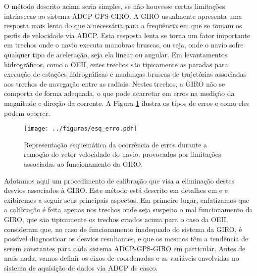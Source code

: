 O método descrito acima seria simples, se não houvesse certas limitações in\-trín\-se\-cas ao sistema ADCP-GPS-GIRO. 
A GIRO usualmente apresenta uma resposta mais lenta do que a necessária para a freq\"uência em que se tomam os 
perfis de velocidade via ADCP. Esta resposta lenta se torna um fator importante em trechos onde o navio 
executa manobras bruscas, ou seja, onde o navio sofre qualquer tipo de aceleração, seja ela linear ou angular.
 Em levantamentos hidrográficos, como a OEII, estes trechos são tipicamente as paradas
para execução de estações hidrográficas e mudanças bruscas de trajetórias associadas aos trechos de navegação 
entre as radiais. Nestes trechos, a GIRO não se comporta de forma adequada, o que pode acarretar em erros na medição da 
magnitude e direção da corrente. A Figura \ref{fig:esq_erros} ilustra os tipos de erros e como eles podem ocorrer.

 \begin{figure}
 \begin{center}
  \texttt{[image: ../figuras/esq\_erro.pdf]}
 \end{center}
 \vspace{-.25cm}
 \renewcommand{\baselinestretch}{1}
 \caption{\label{fig:esq_erros} \small Representação esquemática da ocorrência de erros durante a remoção do vetor
velocidade do navio, provocados por limitações associadas ao funcionamento da GIRO.}
\end{figure}

Adotamos aqui um procedimento de calibração que visa a eliminação destes desvios associados à GIRO. Este método está 
descrito em detalhes em \cite{joyce1989} e \cite{pollard_read1989} e exibiremos a seguir seus principais aspectos. Em primeiro lugar, enfatizamos
que a calibração é feita apenas nos trechos onde seja suspeito o mal funcionamento da GIRO, que são tipicamente os trechos
citados acima para o caso da OEII. \cite{pollard_read1989} consideram que, no caso de funcionamento inadequado do sistema da GIRO, 
é possível diagnosticar os desvios resultantes, e que os mesmos têm a tendência de serem constantes para cada sistema
ADCP-GPS-GIRO em particular. Antes de mais nada, vamos definir os eixos de coordenadas e as variáveis envolvidas
 no sistema de aquisição de dados via ADCP de casco. 

